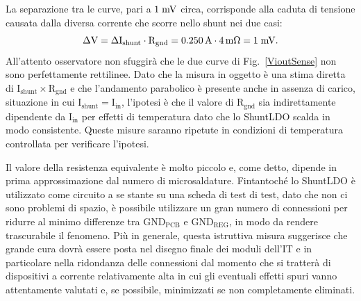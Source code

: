 La separazione tra le curve, pari a $1\rm \; mV$ circa, corrisponde alla caduta di tensione causata dalla diversa corrente che scorre nello shunt nei due casi:
\begin{equation}
\mathrm{\Delta V = \Delta I_{shunt} \cdot R_{gnd} = 0.250\rm \, A \cdot 4{\rm \, m\Omega} = 1\rm \; mV}.
\end{equation}
All'attento osservatore non sfuggir\`a che le due curve di Fig.~\ref{VioutSense} non sono perfettamente rettilinee. Dato che la misura in oggetto \`e una stima diretta di $\mathrm{I_{shunt}\times R_{gnd}}$ e che l'andamento parabolico \`e presente anche in assenza di carico, situazione in cui $\mathrm{I_{shunt}=I_{in}}$, l'ipotesi \`e che il valore di $\mathrm{R_{gnd}}$ sia indirettamente dipendente da $\mathrm{I_{in}}$ per effetti di temperatura dato che lo ShuntLDO scalda in modo consistente. Queste misure saranno ripetute in condizioni di temperatura controllata per verificare l'ipotesi.

%

Il valore della resistenza equivalente è molto piccolo e, come detto, dipende in prima approssimazione dal numero di microsaldature.
Fintantoché lo ShuntLDO è utilizzato come circuito a se stante su una scheda di test di test, dato che non ci sono problemi di spazio, è possibile utilizzare un gran numero di connessioni per ridurre al minimo differenze tra $\mathrm{GND_{PCB}}$ e $\mathrm{GND_{REG}}$, in modo da rendere trascurabile il fenomeno. 
Pi\`u in generale, questa istruttiva misura suggerisce che grande cura dovr\`a essere posta nel disegno finale dei moduli dell'IT e in particolare nella ridondanza delle connessioni dal momento che si tratter\`a di dispositivi a corrente relativamente alta in cui gli eventuali effetti spuri vanno attentamente valutati e, se possibile, minimizzati se non completamente eliminati.

